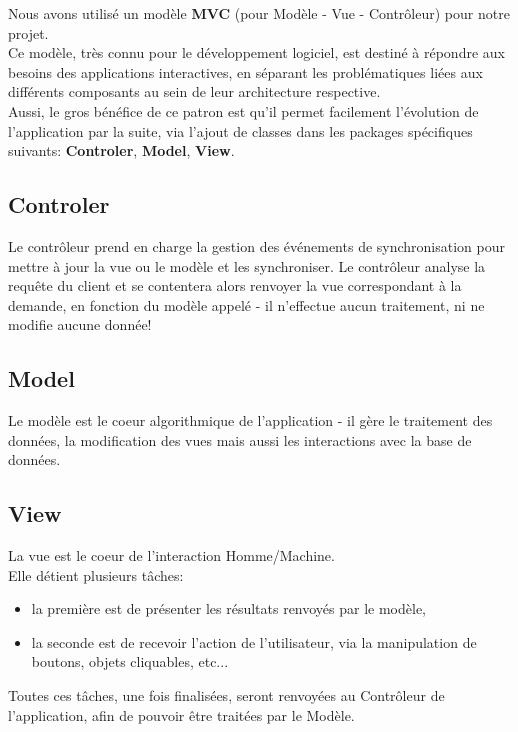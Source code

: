 \documentclass[pdftex,12pt,a4paper]{report}
\begin{document}
\begin{spacing}{1.2}
Nous avons utilisé un modèle \textbf{MVC} (pour Modèle - Vue - Contrôleur) pour notre projet.\\
Ce modèle, très connu pour le développement logiciel, est destiné à répondre aux besoins des applications interactives, en séparant les problématiques liées aux différents composants au sein de leur architecture respective.\\
Aussi, le gros bénéfice de ce patron est qu'il permet facilement l'évolution de l'application par la suite, via l'ajout de classes dans les packages spécifiques suivants: \textbf{Controler}, \textbf{Model}, \textbf{View}.

\subsection{Controler}

Le contrôleur prend en charge la gestion des événements de synchronisation pour mettre à jour la vue ou le modèle et les synchroniser. Le contrôleur analyse la requête du client et se contentera alors renvoyer la vue correspondant à la demande, en fonction du modèle appelé - il n'effectue aucun traitement, ni ne modifie aucune donnée!
\\

\subsection{Model}

Le modèle est le coeur algorithmique de l'application - il gère le traitement des données, la modification des vues mais aussi les interactions avec la base de données.

\subsection{View}

La vue est le coeur de l'interaction Homme/Machine.
\\
Elle détient plusieurs tâches:
\begin{itemize}
\item{la première est de présenter les résultats renvoyés par le modèle,}
\item{la seconde est de recevoir l'action de l'utilisateur, via la manipulation de boutons, objets cliquables, etc...}
\end{itemize}
Toutes ces tâches, une fois finalisées, seront renvoyées au Contrôleur de l'application, afin de pouvoir être traitées par le Modèle.


\end{spacing}
\end{document}
